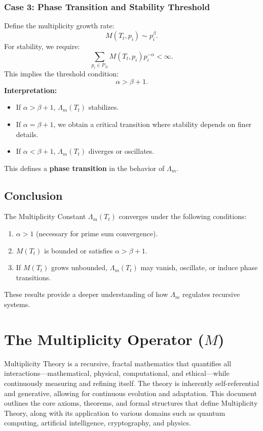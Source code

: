 \documentclass[12pt]{article}
\begin{document}
\subsubsection{Case 3: Phase Transition and Stability Threshold}
Define the multiplicity growth rate:
\begin{equation}
    M(T_t, p_i) \sim p_i^{\beta}.
\end{equation}
For stability, we require:
\begin{equation}
    \sum_{p_i \in P_N} M(T_t, p_i) p_i^{-\alpha} < \infty.
\end{equation}
This implies the threshold condition:
\begin{equation}
    \alpha > \beta + 1.
\end{equation}
\textbf{Interpretation:}
\begin{itemize}
    \item If \( \alpha > \beta + 1 \), \( \Lambda_m(T_t) \) stabilizes.
    \item If \( \alpha = \beta + 1 \), we obtain a critical transition where stability depends on finer details.
    \item If \( \alpha < \beta + 1 \), \( \Lambda_m(T_t) \) diverges or oscillates.
\end{itemize}
This defines a \textbf{phase transition} in the behavior of \( \Lambda_m \).

\subsection{Conclusion}
The Multiplicity Constant \( \Lambda_m(T_t) \) converges under the following conditions:
\begin{enumerate}
    \item \( \alpha > 1 \) (necessary for prime sum convergence).
    \item \( M(T_t) \) is bounded or satisfies \( \alpha > \beta + 1 \).
    \item If \( M(T_t) \) grows unbounded, \( \Lambda_m(T_t) \) may vanish, oscillate, or induce phase transitions.
\end{enumerate}
These results provide a deeper understanding of how \( \Lambda_m \) regulates recursive systems.

\section{The Multiplicity Operator (\(M\))}
Multiplicity Theory is a recursive, fractal mathematics that quantifies all interactions—mathematical, physical, computational, and ethical—while continuously measuring and refining itself. The theory is inherently self-referential and generative, allowing for continuous evolution and adaptation. This document outlines the core axioms, theorems, and formal structures that define Multiplicity Theory, along with its application to various domains such as quantum computing, artificial intelligence, cryptography, and physics.
\end{document}
